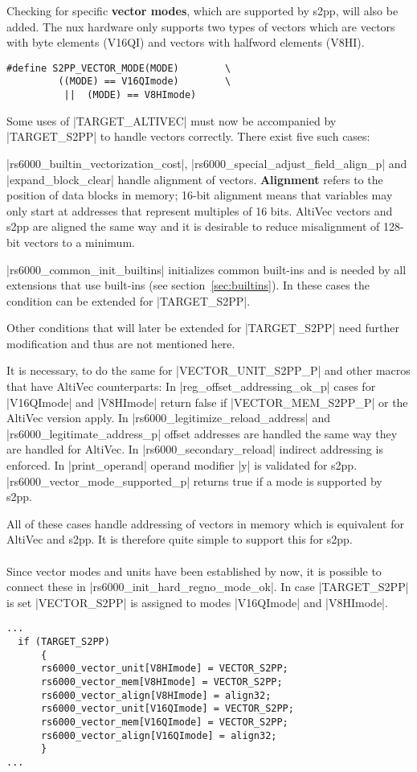 Checking for specific \textbf{vector modes}, which are supported by \ac{s2pp}, will also be added.
The nux hardware only supports two types of vectors which are vectors with byte elements (V16QI) and vectors with halfword elements (V8HI).
\begin{lstlisting}
#define S2PP_VECTOR_MODE(MODE)        \
         ((MODE) == V16QImode)        \
          ||  (MODE) == V8HImode)
\end{lstlisting}

Some uses of |TARGET_ALTIVEC| must now be accompanied by |TARGET_S2PP| to handle vectors correctly.
There exist five such cases:

|rs6000_builtin_vectorization_cost|, |rs6000_special_adjust_field_align_p| and |expand_block_clear| handle alignment of vectors.
\textbf{Alignment} refers to the position of data blocks in memory; 16-bit alignment means that variables may only start at addresses that represent multiples of 16 bits.
AltiVec vectors and s2pp are aligned the same way and it is desirable to reduce misalignment of 128-bit vectors to a minimum.

|rs6000_common_init_builtins| initializes common built-ins and is needed by all extensions that use built-ins (see section~\ref{sec:builtins}).
In these cases the condition can be extended for |TARGET_S2PP|.

Other conditions that will later be extended for |TARGET_S2PP| need further modification and thus are not mentioned here.

It is necessary, to do the same for |VECTOR_UNIT_S2PP_P| and other macros that have AltiVec counterparts:
In |reg_offset_addressing_ok_p| cases for |V16QImode| and |V8HImode| return false if |VECTOR_MEM_S2PP_P| or the AltiVec version apply.
In |rs6000_legitimize_reload_address| and |rs6000_legitimate_address_p| offset addresses are handled the same way they are handled for AltiVec.
In |rs6000_secondary_reload| indirect addressing is enforced.
In |print_operand| operand modifier |y| is validated for \ac{s2pp}.
|rs6000_vector_mode_supported_p| returns true if a mode is supported by \ac{s2pp}.

All of these cases handle addressing of vectors in memory which is equivalent for AltiVec and \ac{s2pp}.
It is therefore quite simple to support this for \ac{s2pp}.
\\
\\
Since vector modes and units have been established by now, it is possible to connect these in |rs6000_init_hard_regno_mode_ok|.
In case |TARGET_S2PP| is set |VECTOR_S2PP| is assigned to modes |V16QImode| and |V8HImode|.
\begin{lstlisting}
...
  if (TARGET_S2PP)
      {
      rs6000_vector_unit[V8HImode] = VECTOR_S2PP;
      rs6000_vector_mem[V8HImode] = VECTOR_S2PP;
      rs6000_vector_align[V8HImode] = align32;
      rs6000_vector_unit[V16QImode] = VECTOR_S2PP;
      rs6000_vector_mem[V16QImode] = VECTOR_S2PP;
      rs6000_vector_align[V16QImode] = align32;
      }
...
\end{lstlisting}

